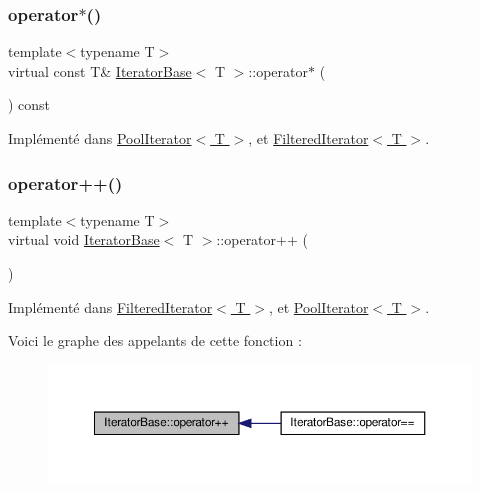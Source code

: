 \subsubsection{\texorpdfstring{operator$\ast$()}{operator*()}\hspace{0.1cm}{\footnotesize\ttfamily [2/2]}}
{\footnotesize\ttfamily template$<$typename T$>$ \\
virtual const T\& \hyperlink{class_iterator_base}{Iterator\+Base}$<$ T $>$\+::operator$\ast$ (\begin{DoxyParamCaption}{ }\end{DoxyParamCaption}) const\hspace{0.3cm}{\ttfamily [pure virtual]}}



Implémenté dans \hyperlink{class_pool_iterator_ab8a7e0669bfd1cd4335ca726bba77127}{Pool\+Iterator$<$ T $>$}, et \hyperlink{class_filtered_iterator_aab76ce411b72c85c3e6a9007a6c9fd98}{Filtered\+Iterator$<$ T $>$}.

\mbox{\label{class_iterator_base_a816f35e9020716d212124a34f1c033fb}} 
\subsubsection{\texorpdfstring{operator++()}{operator++()}}
{\footnotesize\ttfamily template$<$typename T$>$ \\
virtual void \hyperlink{class_iterator_base}{Iterator\+Base}$<$ T $>$\+::operator++ (\begin{DoxyParamCaption}{ }\end{DoxyParamCaption})\hspace{0.3cm}{\ttfamily [pure virtual]}}



Implémenté dans \hyperlink{class_filtered_iterator_ae31347c47637172be3d19dc3be30f5cc}{Filtered\+Iterator$<$ T $>$}, et \hyperlink{class_pool_iterator_a0da86ab88d60973aee45e6a51a929138}{Pool\+Iterator$<$ T $>$}.

Voici le graphe des appelants de cette fonction \+:
\nopagebreak
\begin{figure}[H]
\begin{center}
\leavevmode
\includegraphics[width=350pt]{class_iterator_base_a816f35e9020716d212124a34f1c033fb_icgraph}
\end{center}
\end{figure}
\mbox{\label{class_iterator_base_aa9bf0f75a8bb7e4d416a9b88ccacd9c7}} 
